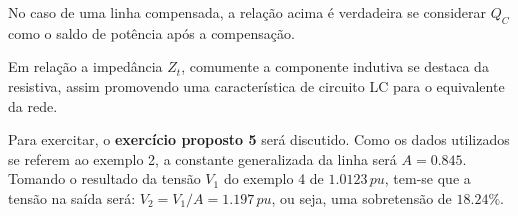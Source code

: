 No caso de uma linha compensada, a relação acima é verdadeira se considerar $Q_C$ como o saldo de potência após a compensação. 

Em relação a impedância $Z_t$, comumente a componente indutiva se destaca da resistiva, assim promovendo uma característica de circuito LC para o equivalente da rede. 

Para exercitar, o \textbf{exercício proposto 5} será discutido. Como os dados utilizados se referem ao exemplo 2, a constante generalizada da linha será $A = 0.845$. Tomando o resultado da tensão $V_1$ do exemplo 4 de $1.0123 \, pu$, tem-se que a tensão na saída será: $V_2=V_1/A = 1.197 \, pu$, ou seja, uma sobretensão de $18.24\%$.

